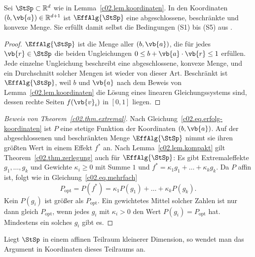 \begin{vertiefung}[id=c02.v3,
    titel={Warum ein Extremaleffekt genügt},
    wozu={Der Kern benutzt Theorem~\ref{c02.thm.extremal} ohne Beweis. Hier wird er für
      jeden Zustandsraum geführt.},
    voraussetzung={Vertiefungen~\ref{c02.v1} und \ref{c02.v2}; stetige Funktionen auf
      abgeschlossenen, beschränkten Mengen. Der Kern rechnet das Optimum für die drei
      Theorien in Proposition~\ref{c02.prop.optimum} direkt aus und braucht diesen Block
      nicht.},
    zurueck={Um zwei Präparationen bestmöglich zu unterscheiden, genügt es, die
      Extremaleffekte durchzugehen.}]
  \begin{lemma}\label{c02.lem.kompakt}
    Sei $\StSp \subset \mathbb{R}^d$ wie in Lemma~\ref{c02.lem.koordinaten}. In den
    Koordinaten $(b, \vb{a}) \in \mathbb{R}^{d+1}$ ist $\EffAlg{\StSp}$ eine
    abgeschlossene, beschränkte und konvexe Menge. Sie erfüllt damit selbst die
    Bedingungen (S1) bis (S5) aus .
  \end{lemma}
  \begin{proof}
    $\EffAlg{\StSp}$ ist die Menge aller $(b, \vb{a})$, die für jedes $\vb{r} \in \StSp$
    die beiden Ungleichungen $0 \leq b + \vb{a}\cdot\vb{r} \leq 1$ erfüllen. Jede einzelne
    Ungleichung beschreibt eine abgeschlossene, konvexe Menge, und ein Durchschnitt solcher
    Mengen ist wieder von dieser Art. Beschränkt ist $\EffAlg{\StSp}$, weil $b$ und
    $\vb{a}$ nach dem Beweis von Lemma~\ref{c02.lem.koordinaten} die Lösung eines linearen
    Gleichungssystems sind, dessen rechte Seiten $f(\vb{v}_i)$ in $[0,1]$ liegen.
  \end{proof}

  \begin{proof}[Beweis von Theorem~\ref{c02.thm.extremal}]
    Nach Gleichung~\eqref{c02.eq.erfolg-koordinaten} ist $P$ eine stetige Funktion der
    Koordinaten $(b, \vb{a})$. Auf der abgeschlossenen und beschränkten Menge
    $\EffAlg{\StSp}$ nimmt sie ihren größten Wert in einem Effekt $f^{*}$ an. Nach
    Lemma~\ref{c02.lem.kompakt} gilt Theorem~\ref{c02.thm.zerlegung} auch für
    $\EffAlg{\StSp}$: Es gibt Extremaleffekte $g_1, \dots, g_k$ und Gewichte
    $\kappa_i \geq 0$ mit Summe $1$ und $f^{*} = \kappa_1 g_1 + \dots + \kappa_k g_k$. Da $P$ affin
    ist, folgt wie in Gleichung~\eqref{c02.eq.mehrfach}
    \begin{equation*}
      P_{\mathrm{opt}} = P(f^{*}) = \kappa_1 P(g_1) + \dots + \kappa_k P(g_k) .
    \end{equation*}
    Kein $P(g_i)$ ist größer als $P_{\mathrm{opt}}$. Ein gewichtetes Mittel solcher Zahlen
    ist nur dann gleich $P_{\mathrm{opt}}$, wenn jedes $g_i$ mit $\kappa_i > 0$ den Wert
    $P(g_i) = P_{\mathrm{opt}}$ hat. Mindestens ein solches $g_i$ gibt es.
  \end{proof}

  Liegt $\StSp$ in einem affinen Teilraum kleinerer Dimension, so wendet man das Argument
  in Koordinaten dieses Teilraums an.
\end{vertiefung}

